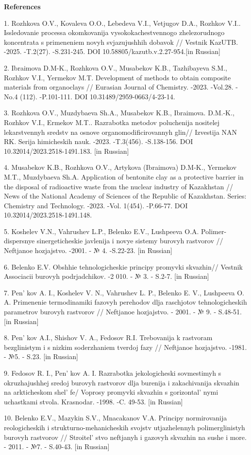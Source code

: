 \begin{center}
{\bfseries References}
\end{center}

\begin{refs}
1. Rozhkova O.V., Kovaleva O.O., Lebedeva V.I., Vetjugov D.A., Rozhkov
V.I.. Issledovanie processa okomkovanija vysokokachestvennogo
zhelezorudnogo koncentrata s primeneniem novyh svjazujushhih dobavok //
Vestnik KazUTB. -2025. -T.2(27). -S.231-245. DOI
10.58805/kazutb.v.2.27-954.{[}in Russian{]}

2. Ibraimova D.M-K., Rozhkova O.V., Musabekov K.B., Tazhibayeva S.M.,
Rozhkov V.I., Yermekov M.T. Development of methods to obtain composite
materials from organoclays // Eurasian Journal of Chemistry. -2023.
-Vol.28. -No.4 (112). -P.101-111. DOI 10.31489/2959-0663/4-23-14.

3. Rozhkova O.V., Muzdybaeva Sh.A., Musabekov K.B., Ibraimova. D.M.-K.,
Rozhkov V.I., Ermekov M.T.. Razrabotka metodov poluchenija nositelej
lekarstvennyh sredstv na osnove organomodificirovannyh glin// Izvestija
NAN RK. Serija himicheskih nauk. -2023. -T.3(456). -S.138-156. DOI
10.32014/2023.2518-1491.183. {[}in Russian{]}

4. Musabekov K.B., Rozhkova O.V., Artykova (Ibraimova) D.M-K., Yermekov
M.T., Muzdybaeva Sh.A. Application of bentonite clay as a protective
barrier in the disposal of radioactive waste from the nuclear industry
of Kazakhstan // News of the National Academy of Sciences of the
Republic of Kazakhstan. Series: Chemistry and Technology. -2023. -Vol.
1(454). -P.66-77. DOI 10.32014/2023.2518-1491.148.

5. Koshelev V.N., Vahrushev L.P., Belenko E.V., Lushpeeva O.A.
Polimer-dispersnye sinergeticheskie javlenija i novye sistemy burovyh
rastvorov // Neftjanoe hozjajstvo. -2001. - № 4. -S.22-23. {[}in
Russian{]}

6. Belenko E.V. Obshhie tehnologicheskie principy promyvki skvazhin//
Vestnik Associacii burovyh podrjadchikov. -2 010. - № 3. - S.2-7. {[}in
Russian{]}

7. Pen' kov A. I., Koshelev V. N., Vahrushev L. P.,
Belenko E. V., Lushpeeva O. A. Primenenie termodinamiki fazovyh
perehodov dlja raschjotov tehnologicheskih parametrov burovyh rastvorov
// Neftjanoe hozjajstvo. - 2001. - № 9. - S.48-51. {[}in Russian{]}

8. Pen' kov A.I., Shishov V. A., Fedosov R.I. Trebovanija
k rastvoram bezglinistym i s nizkim soderzhaniem tverdoj fazy //
Neftjanoe hozjajstvo. -1981. - №5. - S.23. {[}in Russian{]}

9. Fedosov R. I., Pen' kov A. I. Razrabotka
jekologicheski sovmestimyh s okruzhajushhej sredoj burovyh rastvorov
dlja burenija i zakachivanija skvazhin na arkticheskom
shel' fe/ Voprosy promyvki skvazhin s
gorizontal' nymi uchastkami stvola. Krasnodar. -1998. -C.
49-53. {[}in Russian{]}

10. Belenko E.V., Mazykin S.V., Mnacakanov V.A. Principy normirovanija
reologicheskih i strukturno-mehanicheskih svojstv utjazhelennyh
polimerglinistyh burovyh rastvorov // Stroitel' stvo
neftjanyh i gazovyh skvazhin na sushe i more. - 2011. - №7. - S.40-43.
{[}in Russian{]}
\end{refs}

